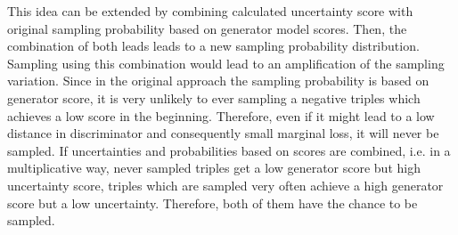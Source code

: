 This idea can be extended by combining calculated uncertainty score with original sampling probability based on generator model scores.
Then, the combination of both leads leads to a new sampling probability distribution.
Sampling using this combination would lead to an amplification of the sampling variation.
Since in the original approach the sampling probability is based on generator score, it is very unlikely to ever sampling a negative triples which achieves a low score in the beginning.
Therefore, even if it might lead to a low distance in discriminator and consequently small marginal loss, it will never be sampled.
If uncertainties and probabilities based on scores are combined, i.e. in a multiplicative way, never sampled triples get a low generator score but high uncertainty score, triples which are sampled very often achieve a high generator score but a low uncertainty.
Therefore, both of them have the chance to be sampled.


